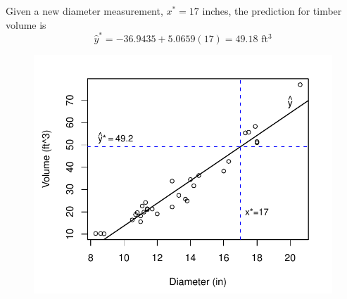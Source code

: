 \documentclass[10pt]{beamer}
\begin{document}
\begin{frame}
Given a new diameter measurement, $x^*=17$ inches, the prediction for timber volume is\\ 
$$\hat{y}^* = -36.9435 + 5.0659(17) = 49.18 \text{ ft$^3$}$$
\begin{figure}
\includegraphics[scale=0.6]{figure/scatter1.pdf}
\end{figure}
\end{frame}


\end{document}
